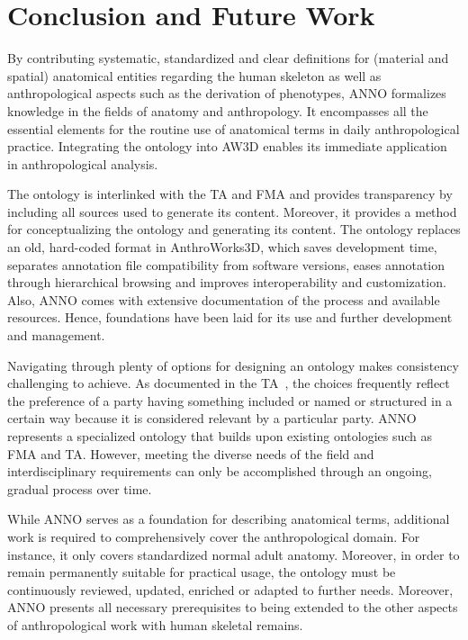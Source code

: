 \documentclass[sw]{iosart2x}
\newcommand{\aw}{AnthroWorks3D}
\begin{document}
\section{Conclusion and Future Work}

By contributing systematic, standardized and clear definitions for (material and spatial) anatomical entities regarding the human skeleton as well as anthropological aspects such as the derivation of phenotypes, ANNO formalizes knowledge in the fields of anatomy and anthropology.
It encompasses all the essential elements for the routine use of anatomical terms in daily anthropological practice.
Integrating the ontology into AW3D enables its immediate application in anthropological analysis.

The ontology is interlinked with the TA and FMA and provides transparency by including all sources used to generate its content.
Moreover, it provides a method for conceptualizing the ontology and generating its content.
The ontology replaces an old, hard-coded format in \aw{}, which saves development time, separates annotation file compatibility from software versions, eases annotation through hierarchical browsing and improves interoperability and customization.
Also, ANNO comes with extensive documentation of the process and available resources.
Hence, foundations have been laid for its use and further development and management.

Navigating through plenty of options for designing an ontology makes consistency challenging to achieve.
As documented in the TA~\citep[part II]{ta2}, the choices frequently reflect the preference of a party having something included or named or structured in a certain way because it is considered relevant by a particular party.
ANNO represents a specialized ontology that builds upon existing ontologies such as FMA and TA.
However, meeting the diverse needs of the field and interdisciplinary requirements can only be accomplished through an ongoing, gradual process over time.

While ANNO serves as a foundation for describing anatomical terms, additional work is required to comprehensively cover the anthropological domain.
For instance, it only covers standardized normal adult anatomy.
Moreover, in order to remain permanently suitable for practical usage, the ontology must be continuously reviewed, updated, enriched or adapted to further needs.
Moreover, ANNO presents all necessary prerequisites to being extended to the other aspects of anthropological work with human skeletal remains.
\end{document}
